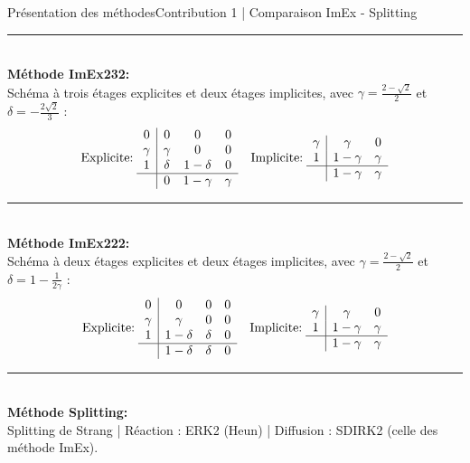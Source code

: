 \begin{frame}{Présentation des méthodes}{Contribution 1 | Comparaison ImEx - Splitting}

\noindent\color{Primary}\rule{\linewidth}{0.6pt}\color{black}\\
\textbf{Méthode ImEx232:\\}
Schéma à trois étages explicites et deux étages implicites, avec $\gamma = \tfrac{2-\sqrt{2}}{2}$ et $\delta = -\tfrac{2\sqrt{2}}{3}$ :
\[
\text{Explicite:}\;\begin{array}{c|ccc}
                        0 & 0 & 0 & 0\\
                        \gamma & \gamma & 0 & 0\\
                        1 & \delta & 1-\delta & 0\\ \hline
                        & 0 & 1-\gamma & \gamma
                    \end{array} \quad
\text{Implicite:}\;
                    \begin{array}{c|cc}
                        \gamma & \gamma & 0\\
                        1 & 1-\gamma & \gamma\\ \hline
                        & 1-\gamma & \gamma
                    \end{array}
\]
\pause
\noindent\color{Primary}\rule{\linewidth}{0.6pt}\color{black}\\
\textbf{Méthode ImEx222:\\}
Schéma à deux étages explicites et deux étages implicites, avec $\gamma = \tfrac{2-\sqrt{2}}{2}$ et $\delta = 1 - \tfrac{1}{2\gamma}$ :
\[
\text{Explicite:}\;
\begin{array}{c|ccc}
0 & 0 & 0 & 0\\
\gamma & \gamma & 0 & 0\\
1 & 1-\delta & \delta & 0\\ \hline
 & 1-\delta & \delta & 0
\end{array}
\quad
\text{Implicite:}\;
\begin{array}{c|cc}
\gamma & \gamma & 0\\
1 & 1-\gamma & \gamma\\ \hline
 & 1-\gamma & \gamma
\end{array}
\]
\pause
\noindent\color{Primary}\rule{\linewidth}{0.6pt}\color{black}\\
\textbf{Méthode Splitting:\\}
Splitting de Strang | Réaction : ERK2 (Heun) | Diffusion : SDIRK2 (celle des méthode ImEx).
\end{frame}
